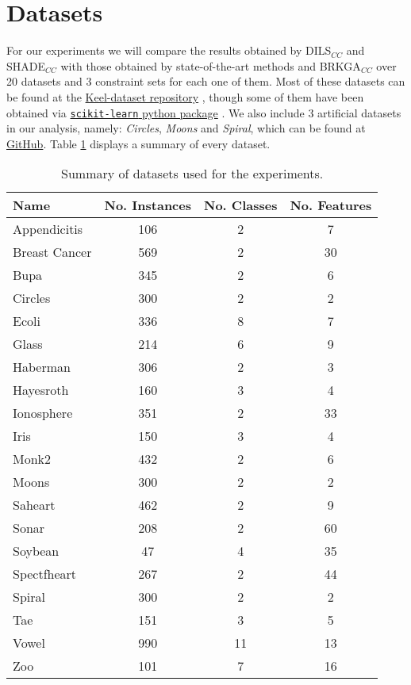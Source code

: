 \section{Datasets}

For our experiments we will compare the results obtained by \acs{DILS}$_{CC}$ and \acs{SHADE}$_{CC}$ with those obtained by state-of-the-art methods and \acs{BRKGA}$_{CC}$ over 20 datasets and 3 constraint sets for each one of them. Most of these datasets can be found at the \href{https://sci2s.ugr.es/keel/category.php?cat=clas}{Keel-dataset repository} \cite{triguero2017keel}, though some of them have been obtained via
\href{https://scikit-learn.org/stable/datasets/index.html}{\texttt{scikit-learn} python package} \cite{scikit-learn}. We also include 3 artificial datasets in our analysis, namely: \textit{Circles}, \textit{Moons} and \textit{Spiral}, which can be found at \href{https://github.com/GermangUgr/DILS_CC}{GitHub}. Table \ref{tab:datasets} displays a summary of every dataset.

\begin{table}[!h]
	\centering
	\small
	\begin{tabular}{l c c c}
		\hline
		Name & No. Instances & No. Classes & No. Features \\
		\hline
		Appendicitis & 106 & 2 & 7 \\
		Breast Cancer & 569 & 2 & 30 \\
		Bupa & 345 & 2 & 6 \\
		Circles & 300 & 2 & 2 \\
		Ecoli & 336 & 8 & 7 \\
		Glass & 214 & 6 & 9 \\
		Haberman & 306 & 2 & 3 \\
		Hayesroth & 160 & 3 & 4 \\
		Ionosphere & 351 & 2 & 33 \\
		Iris & 150 & 3 & 4 \\
		Monk2 & 432 & 2 & 6 \\
		Moons & 300 & 2 & 2 \\
		Saheart & 462 & 2 & 9 \\
		Sonar & 208 & 2 & 60 \\
		Soybean & 47 & 4 & 35 \\
		Spectfheart & 267 & 2 & 44 \\
		Spiral & 300 & 2 & 2 \\
		Tae & 151 & 3 & 5 \\
		Vowel & 990 & 11 & 13 \\
		Zoo & 101 & 7 & 16 \\
		\hline
		
	\end{tabular}%
	\caption{Summary of datasets used for the experiments.}
	\label{tab:datasets}
\end{table}

